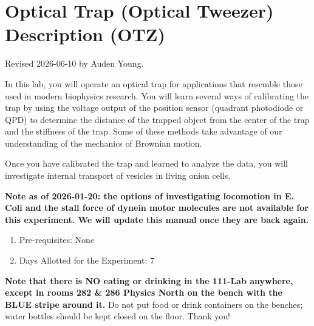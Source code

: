 \documentclass{../lab}
\begin{document}
\maketitle

\tableofcontents

\section{Optical Trap (Optical Tweezer) Description (OTZ)}

Revised 2026-06-10 by Auden Young.

In this lab, you will operate an optical trap for applications that resemble those used in modern biophysics research. You will learn several ways of calibrating the trap by using the voltage output of the position sensor (quadrant photodiode or QPD) to determine the distance of the trapped object from the center of the trap and the stiffness of the trap. Some of these methods take advantage of our understanding of the mechanics of Brownian motion.

Once you have calibrated the trap and learned to analyze the data, you will investigate internal transport of vesicles in living onion cells.


\textbf{Note as of 2026-01-20: the options of investigating locomotion in E. Coli and the stall force of dynein motor molecules are not available for this experiment. We will update this manual once they are back again.}

\begin{enumerate}
    \item Pre-requisites: None

    \item Days Allotted for the Experiment: 7
\end{enumerate}

\textbf{Note that there is NO eating or drinking in the 111-Lab anywhere, except in rooms 282 \& 286 Physics North on the bench with the BLUE stripe around it.} Do not put food or drink containers on the benches; water bottles should be kept closed on the floor. Thank you!

\newpage
\end{document}
